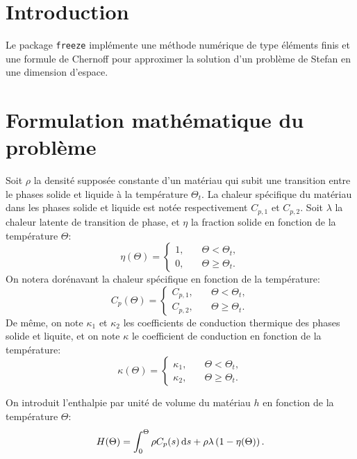 \section{Introduction}
Le package \texttt{freeze} impl\'emente une m\'ethode num\'erique de
type \'el\'ements finis et une formule de Chernoff pour approximer la
solution d'un probl\`eme de Stefan en une dimension d'espace.

\section{Formulation math\'ematique du probl\`eme}
Soit $\rho$ la densit\'e suppos\'ee constante d'un mat\'eriau qui
subit une transition entre le phases solide et liquide \`a la
temp\'erature $\Theta_t$. La chaleur sp\'ecifique du mat\'eriau dans
les phases solide et liquide est not\'ee respectivement $C_{p,1}$ et
$C_{p,2}$. Soit $\lambda$ la chaleur latente de transition de phase,
et $\eta$ la fraction solide en fonction de la temp\'erature $\Theta$:
\begin{equation*}
  \eta(\Theta) = \left\{
  \begin{array}{ll}
    1,&\quad \Theta < \Theta_t,\\
    0,&\quad \Theta \geq \Theta_t.
  \end{array}
  \right.
\end{equation*}
On notera dor\'enavant la chaleur sp\'ecifique en fonction de la
temp\'erature:
\begin{equation*}
  C_p(\Theta) = \left\{
  \begin{array}{ll}
    C_{p,1},&\quad \Theta < \Theta_t,\\
    C_{p,2},&\quad \Theta \geq \Theta_t.
  \end{array}
  \right.
\end{equation*}
De m\^eme, on note $\kappa_1$ et $\kappa_2$ les coefficients de
conduction thermique des phases solide et liquite, et on note $\kappa$
le coefficient de conduction en fonction de la temp\'erature:
\begin{equation*}
  \kappa(\Theta) = \left\{
  \begin{array}{ll}
    \kappa_1,&\quad \Theta < \Theta_t,\\
    \kappa_2,&\quad \Theta \geq \Theta_t.
  \end{array}
  \right.
\end{equation*}


On introduit l'enthalpie par unit\'e de volume du mat\'eriau $h$ en
fonction de la temp\'erature $\Theta$:
\begin{equation}
  H(\Theta) = \int_0^\Theta \rho C_p(s)\,\mathrm ds + \rho \lambda \left( 1 - \eta(\Theta) \right).
\end{equation}

